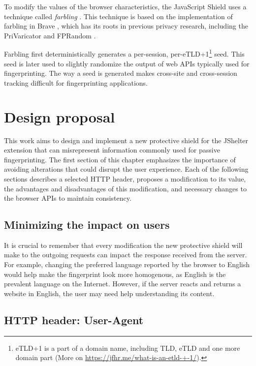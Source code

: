 To modify the values of the browser characteristics, the JavaScript Shield uses a technique called \emph{farbling} \cite{JShelterPaper}. This technique is based on the implementation of farbling in Brave \cite{BraveFingerprintingDefences2}, which has its roots in previous privacy research, including the PriVaricator \cite{PriVaricator} and FPRandom \cite{FPRandom}.

Farbling first deterministically generates a per-session, per-eTLD+1\footnote{eTLD+1 is a part of a domain name, including TLD, eTLD and one more domain part (More on \url{https://jfhr.me/what-is-an-etld-+-1/}).} seed. This seed is later used to slightly randomize the output of web APIs typically used for fingerprinting. The way a seed is generated makes cross-site and cross-session tracking difficult for fingerprinting applications.


\chapter{Design proposal}
\label{Chapter:Design}

This work aims to design and implement a new protective shield for the JShelter extension that can misrepresent information commonly used for passive fingerprinting. The first section of this chapter emphasizes the importance of avoiding alterations that could disrupt the user experience. Each of the following sections describes a selected HTTP header, proposes a modification to its value, the advantages and disadvantages of this modification, and necessary changes to the browser APIs to maintain consistency.

\section{Minimizing the impact on users}

It is crucial to remember that every modification the new protective shield will make to the outgoing requests can impact the response received from the server. For example, changing the preferred language reported by the browser to English would help make the fingerprint look more homogenous, as English is the prevalent language on the Internet. However, if the server reacts and returns a website in English, the user may need help understanding its content.

\section{HTTP header: User-Agent}
\label{SectionHTTPHeaderUserAgent}

